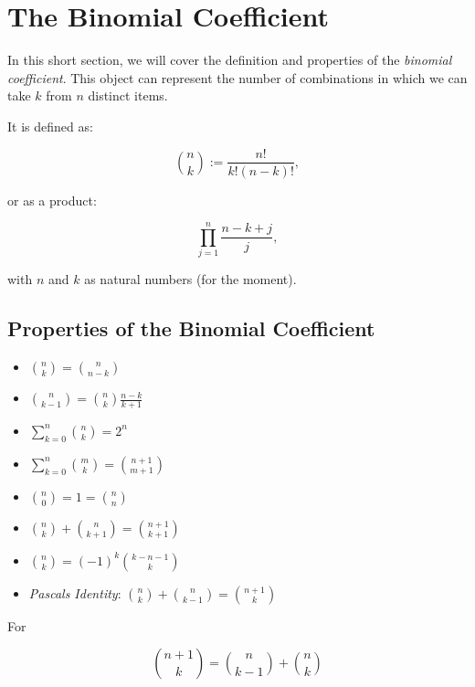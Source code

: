 \chapter{The Binomial Coefficient}

In this short section, we will cover the definition and properties of the \emph{binomial coefficient}.
This object can represent the number of combinations in which we can take \(k\) from \(n\) distinct items.

It is defined as: 

\[
    \binom{n}{k} := \frac{n!}{k!(n-k)!},
\]

or as a product:

\[
    \prod_{j = 1}^{n} \frac{n-k+j}{j},
\]

with \(n\) and \(k\) as natural numbers (for the moment).

\section{Properties of the Binomial Coefficient}

\begin{itemize}
    
    \item \( \binom{n}{k} =  \binom{n}{n - k} \)

    \item \( \binom{n}{k - 1} = \binom{n}{k} \frac{n - k}{k + 1} \)

    \item \( \sum_{k = 0}^{n} \binom{n}{k} = 2^n \)

    \item \( \sum_{k = 0}^{n} \binom{m}{k} = \binom{n + 1}{m + 1} \)

    \item \( \binom{n}{0} = 1 = \binom{n}{n} \)

    \item \( \binom{n}{k} + \binom{n}{k + 1} = \binom{n + 1}{k + 1} \)

    \item \( \binom{n}{k} = {(-1)}^k \binom{k - n - 1}{k} \)

    \item \emph{Pascals Identity}: \( \binom{n}{k} + \binom{n}{k - 1} = \binom{n + 1}{k} \)

\end{itemize}

For 

\[
    \binom{n + 1}{k} = \binom{n}{k - 1} + \binom{n}{k}
\]

